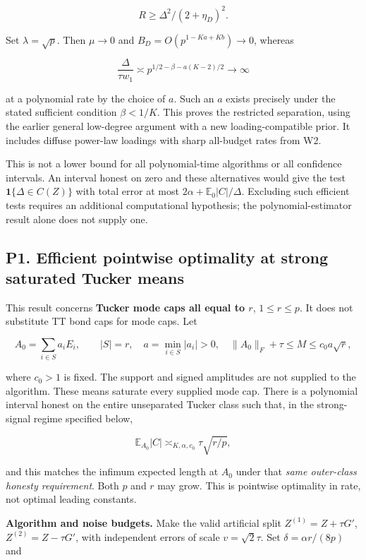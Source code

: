 \documentclass[
  10pt,
]{article}
\begin{document}
\[R\ge\Delta^2/(2+\eta_D)^2.\]

Set \(\lambda=\sqrt p\). Then \(\mu\to0\) and
\(B_D=O(p^{1-Ka+Kb})\to0\), whereas

\[\frac{\Delta}{\tau w_1}
\asymp p^{1/2-\beta-a(K-2)/2}\longrightarrow\infty\]

at a polynomial rate by the choice of \(a\). Such an \(a\) exists
precisely under the stated sufficient condition \(\beta<1/K\). This
proves the restricted separation, using the earlier general low-degree
argument with a new loading-compatible prior. It includes diffuse
power-law loadings with sharp all-budget rates from W2.

This is not a lower bound for all polynomial-time algorithms or all
confidence intervals. An interval honest on zero and these alternatives
would give the test \(\mathbf1\{\Delta\in C(Z)\}\) with total error at
most \(2\alpha+\mathbb E_0|C|/\Delta\). Excluding such efficient tests
requires an additional computational hypothesis; the
polynomial-estimator result alone does not supply one.

\subsection{P1. Efficient pointwise optimality at strong saturated
Tucker
means}\label{p1.-efficient-pointwise-optimality-at-strong-saturated-tucker-means}

This result concerns \textbf{Tucker mode caps all equal to \(r\)},
\(1\le r\le p\). It does not substitute TT bond caps for mode caps. Let

\[A_0=\sum_{i\in S}a_i E_i,\qquad |S|=r,\quad
a=\min_{i\in S}|a_i|>0,\quad
\|A_0\|_F+\tau\le M\le c_0a\sqrt r,\]

where \(c_0>1\) is fixed. The support and signed amplitudes are not
supplied to the algorithm. These means saturate every supplied mode cap.
There is a polynomial interval honest on the entire unseparated Tucker
class such that, in the strong-signal regime specified below,

\[\mathbb E_{A_0}|C|\asymp_{K,\alpha,c_0}\tau\sqrt{r/p},\]

and this matches the infimum expected length at \(A_0\) under that
\emph{same outer-class honesty requirement}. Both \(p\) and \(r\) may
grow. This is pointwise optimality in rate, not optimal leading
constants.

\textbf{Algorithm and noise budgets.} Make the valid artificial split
\(Z^{(1)}=Z+\tau G'\), \(Z^{(2)}=Z-\tau G'\), with independent errors of
scale \(v=\sqrt2\tau\). Set \(\delta=\alpha r/(8p)\) and
\end{document}
